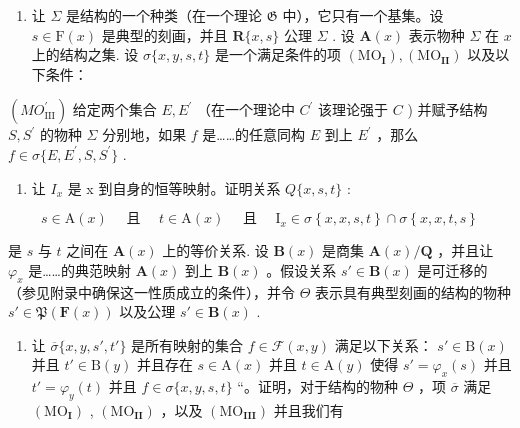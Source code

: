 \begin{enumerate}
\def\labelenumi{\arabic{enumi}.}
\setcounter{enumi}{10}
\tightlist
\item
  让 \(\Sigma\) 是结构的一个种类（在一个理论 \(\mathfrak{G}\) 中），它只有一个基集。设 \(s \in \mathrm{F}(x)\) 是典型的刻画，并且 \(\mathbf{R}\{x, s\}\) 公理 \(\Sigma\) . 设 \(\mathbf{A}(x)\) 表示物种 \(\Sigma\) 在 \(x\) 上的结构之集. 设 \(\sigma\{x, y, s, t\}\) 是一个满足条件的项 \((\mathrm{MO}_{\mathbf{I}}), (\mathrm{MO}_{\mathbf{II}})\) 以及以下条件：
\end{enumerate}

\((MO_{\mathrm{III}}^{\prime})\) 给定两个集合 \(E, E^{\prime}\) （在一个理论中 \(C^{\prime}\) 该理论强于 \(C\) ) 并赋予结构 \(S, S^{\prime}\) 的物种 \(\Sigma\) 分别地，如果 \(f\) 是……的任意同构 \(E\) 到上 \(E^{\prime}\) ，那么 \(f \in \sigma \{E, E^{\prime}, S, S^{\prime}\}\) .

\begin{enumerate}
\def\labelenumi{(\alph{enumi})}
\tightlist
\item
  让 \(I_{x}\) 是 x 到自身的恒等映射。证明关系 \(Q\{x, s, t\}\) :
\end{enumerate}

\[
s \in \mathrm{A} (x) \quad \text { 且 } \quad t \in \mathrm{A} (x) \quad \text { 且 } \quad \mathrm{I} _ {x} \in \sigma \left\{x, x, s, t \right\} \cap \sigma \left\{x, x, t, s \right\}
\]

是 \(s\) 与 \(t\) 之间在 \(\mathbf{A}(x)\) 上的等价关系. 设 \(\mathbf{B}(x)\) 是商集 \(\mathbf{A}(x)/\mathbf{Q}\) ，并且让 \(\varphi_x\) 是……的典范映射 \(\mathbf{A}(x)\) 到上 \(\mathbf{B}(x)\) 。假设关系 \(s' \in \mathbf{B}(x)\) 是可迁移的（参见附录中确保这一性质成立的条件），并令 \(\Theta\) 表示具有典型刻画的结构的物种 \(s' \in \mathfrak{P}(\mathbf{F}(x))\) 以及公理 \(s' \in \mathbf{B}(x)\) .

\begin{enumerate}
\def\labelenumi{(\alph{enumi})}
\setcounter{enumi}{1}
\tightlist
\item
  让 \(\overline{\sigma}\{x, y, s', t'\}\) 是所有映射的集合 \(f \in \mathcal{F}(x, y)\) 满足以下关系： \(s' \in \mathrm{B}(x)\) 并且 \(t' \in \mathrm{B}(y)\) 并且存在 \(s \in \mathrm{A}(x)\) 并且 \(t \in \mathrm{A}(y)\) 使得 \(s' = \varphi_x(s)\) 并且 \(t' = \varphi_y(t)\) 并且 \(f \in \sigma\{x, y, s, t\}\) “。证明，对于结构的物种 \(\Theta\) ，项 \(\overline{\sigma}\) 满足 \((\mathrm{MO}_{\mathbf{I}})\) , \((\mathrm{MO}_{\mathbf{II}})\) ，以及 \((\mathrm{MO}_{\mathbf{III}})\) 并且我们有
\end{enumerate}

